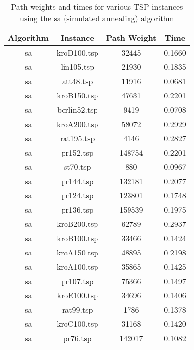\documentclass{article}
\begin{document}
\begin{center}
	\begin{table}[h!]
		\centering
		\begin{tabular}{|c|c|c|c|}
			\hline
			Algorithm & Instance     & Path Weight & Time   \\ \hline
			sa        & kroD100.tsp  & 32445       & 0.1660 \\ \hline
			sa        & lin105.tsp   & 21930       & 0.1835 \\ \hline
			sa        & att48.tsp    & 11916       & 0.0681 \\ \hline
			sa        & kroB150.tsp  & 47631       & 0.2201 \\ \hline
			sa        & berlin52.tsp & 9419        & 0.0708 \\ \hline
			sa        & kroA200.tsp  & 58072       & 0.2929 \\ \hline
			sa        & rat195.tsp   & 4146        & 0.2827 \\ \hline
			sa        & pr152.tsp    & 148754      & 0.2201 \\ \hline
			sa        & st70.tsp     & 880         & 0.0967 \\ \hline
			sa        & pr144.tsp    & 132181      & 0.2077 \\ \hline
			sa        & pr124.tsp    & 123801      & 0.1748 \\ \hline
			sa        & pr136.tsp    & 159539      & 0.1975 \\ \hline
			sa        & kroB200.tsp  & 62789       & 0.2937 \\ \hline
			sa        & kroB100.tsp  & 33466       & 0.1424 \\ \hline
			sa        & kroA150.tsp  & 48895       & 0.2198 \\ \hline
			sa        & kroA100.tsp  & 35865       & 0.1425 \\ \hline
			sa        & pr107.tsp    & 75366       & 0.1497 \\ \hline
			sa        & kroE100.tsp  & 34696       & 0.1406 \\ \hline
			sa        & rat99.tsp    & 1786        & 0.1378 \\ \hline
			sa        & kroC100.tsp  & 31168       & 0.1420 \\ \hline
			sa        & pr76.tsp     & 142017      & 0.1082 \\ \hline
		\end{tabular}
		\caption{Path weights and times for various TSP instances using the sa (simulated annealing) algorithm}
	\end{table}

\end{center}
\end{document}
